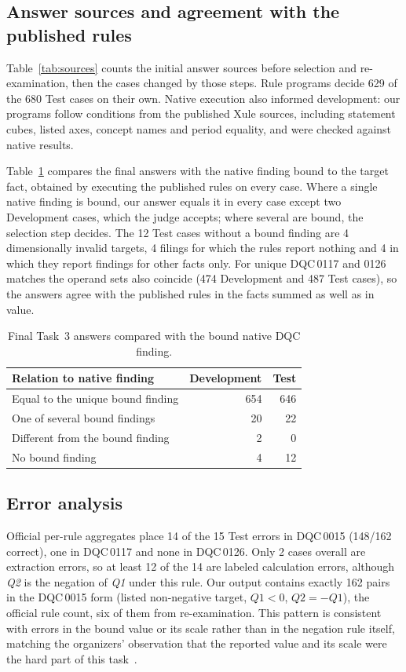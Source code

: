 \documentclass[conference]{IEEEtran}
\newcommand{\DQC}[1]{DQC\,#1}
\newcommand{\QA}{\textit{Q1}}
\newcommand{\QB}{\textit{Q2}}
\begin{document}
\subsection{Answer sources and agreement with the published rules}
Table~\ref{tab:sources} counts the initial answer sources before selection and re-examination, then the cases changed by those steps. Rule programs decide 629 of the 680 Test cases on their own. Native execution also informed development: our programs follow conditions from the published Xule sources, including statement cubes, listed axes, concept names and period equality, and were checked against native results.

Table~\ref{tab:native} compares the final answers with the native finding bound to the target fact, obtained by executing the published rules on every case. Where a single native finding is bound, our answer equals it in every case except two Development cases, which the judge accepts; where several are bound, the selection step decides. The 12 Test cases without a bound finding are 4 dimensionally invalid targets, 4 filings for which the rules report nothing and 4 in which they report findings for other facts only. For unique \DQC{0117} and 0126 matches the operand sets also coincide (474 Development and 487 Test cases), so the answers agree with the published rules in the facts summed as well as in value.

\begin{table}[t]
\caption{Final Task~3 answers compared with the bound native DQC finding.}
\label{tab:native}
\centering\footnotesize
\setlength{\tabcolsep}{4pt}
\begin{tabular}{@{}lrr@{}}
\toprule
Relation to native finding & Development & Test\\
\midrule
Equal to the unique bound finding & 654 & 646\\
One of several bound findings & 20 & 22\\
Different from the bound finding & 2 & 0\\
No bound finding & 4 & 12\\
\bottomrule
\end{tabular}
\end{table}

\subsection{Error analysis}
Official per-rule aggregates place 14 of the 15 Test errors in \DQC{0015} (148/162 correct), one in \DQC{0117} and none in \DQC{0126}. Only 2 cases overall are extraction errors, so at least 12 of the 14 are labeled calculation errors, although \QB{} is the negation of \QA{} under this rule. Our output contains exactly 162 pairs in the \DQC{0015} form (listed non-negative target, $\QA{}<0$, $\QB{}=-\QA{}$), the official rule count, six of them from re-examination. This pattern is consistent with errors in the bound value or its scale rather than in the negation rule itself, matching the organizers' observation that the reported value and its scale were the hard part of this task~\cite{task3results}.
\end{document}
